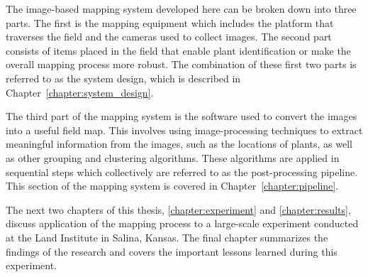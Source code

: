 The image-based mapping system developed here can be broken down into three parts.  The first is the mapping equipment which includes the platform that traverses the field and the cameras used to collect images.  The second part consists of items placed in the field that enable plant identification or make the overall mapping process more robust.  The combination of these first two parts is referred to as the system design, which is described in Chapter~\ref{chapter:system_design}. 

The third part of the mapping system is the software used to convert the images into a useful field map.  This involves using image-processing techniques to extract meaningful information from the images, such as the locations of plants, as well as other grouping and clustering algorithms.  These algorithms are applied in sequential steps which collectively are referred to as the post-processing pipeline.  This section of the mapping system is covered in Chapter~\ref{chapter:pipeline}. 

The next two chapters of this thesis, \ref{chapter:experiment} and \ref{chapter:results}, discuss application of the mapping process to a large-scale experiment conducted at the Land Institute in Salina, Kansas.  The final chapter summarizes the findings of the research and covers the important lessons learned during this experiment.
